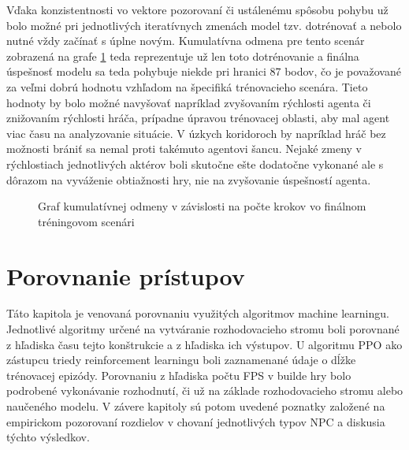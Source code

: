 \documentclass[slovak, master]{diploma}
\begin{document}
Vďaka konzistentnosti vo vektore pozorovaní či ustálenému spôsobu pohybu už bolo možné pri jednotlivých iteratívnych zmenách model tzv. dotrénovať a nebolo nutné vždy začínať s úplne novým. Kumulatívna odmena pre tento scenár zobrazená na grafe \ref{plt:finalScenario} teda reprezentuje už len toto dotrénovanie a finálna úspešnosť modelu sa teda pohybuje niekde pri hranici 87 bodov, čo je považované za veľmi dobrú hodnotu vzhľadom na špecifiká trénovacieho scenára. Tieto hodnoty by bolo možné navyšovať napríklad zvyšovaním rýchlosti agenta či znižovaním rýchlosti hráča, prípadne úpravou trénovacej oblasti, aby mal agent viac času na analyzovanie situácie. V úzkych koridoroch by napríklad hráč bez možnosti brániť sa nemal proti takémuto agentovi šancu. Nejaké zmeny v rýchlostiach jednotlivých aktérov boli skutočne ešte dodatočne vykonané ale s dôrazom na vyváženie obtiažnosti hry, nie na zvyšovanie úspešností agenta. 
\begin{figure}[!htbp]
    \centering
    \caption{Graf kumulatívnej odmeny v závislosti na počte krokov vo finálnom tréningovom scenári}
    \label{plt:finalScenario}
\end{figure}


\chapter{Porovnanie prístupov}
\label{sec:ImplReinforcement learning}
Táto kapitola je venovaná porovnaniu využitých algoritmov machine learningu. Jednotlivé algoritmy určené na vytváranie rozhodovacieho stromu boli porovnané z hľadiska času tejto konštrukcie a z hľadiska ich výstupov. U algoritmu PPO ako zástupcu triedy reinforcement learningu boli zaznamenané údaje o dĺžke trénovacej epizódy. Porovnaniu z hľadiska počtu FPS v builde hry bolo podrobené vykonávanie rozhodnutí, či už na základe rozhodovacieho stromu alebo naučeného modelu. V závere kapitoly sú potom uvedené poznatky založené na empirickom pozorovaní rozdielov v chovaní jednotlivých typov NPC a diskusia týchto výsledkov.
\end{document}
